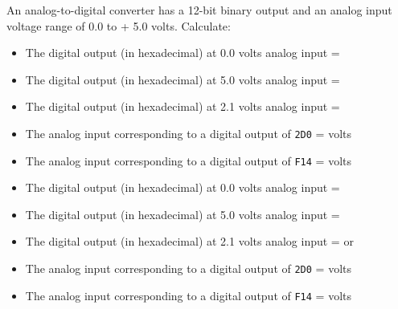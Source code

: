 

An analog-to-digital converter has a 12-bit binary output and an analog input voltage range of 0.0 to + 5.0 volts.  Calculate:

\begin{itemize}
\item{} The digital output (in hexadecimal) at 0.0 volts analog input = \underbar{\hskip 50pt}
\vskip 10pt
\item{} The digital output (in hexadecimal) at 5.0 volts analog input = \underbar{\hskip 50pt}
\vskip 10pt
\item{} The digital output (in hexadecimal) at 2.1 volts analog input = \underbar{\hskip 50pt}
\vskip 10pt
\item{} The analog input corresponding to a digital output of {\tt 2D0} = \underbar{\hskip 50pt} volts
\vskip 10pt
\item{} The analog input corresponding to a digital output of {\tt F14} = \underbar{\hskip 50pt} volts
\end{itemize}







\begin{itemize}
\item{} The digital output (in hexadecimal) at 0.0 volts analog input = 
\vskip 10pt
\item{} The digital output (in hexadecimal) at 5.0 volts analog input = 
\vskip 10pt
\item{} The digital output (in hexadecimal) at 2.1 volts analog input =  or 
\vskip 10pt
\item{} The analog input corresponding to a digital output of {\tt 2D0} =  volts
\vskip 10pt
\item{} The analog input corresponding to a digital output of {\tt F14} =  volts
\end{itemize}












